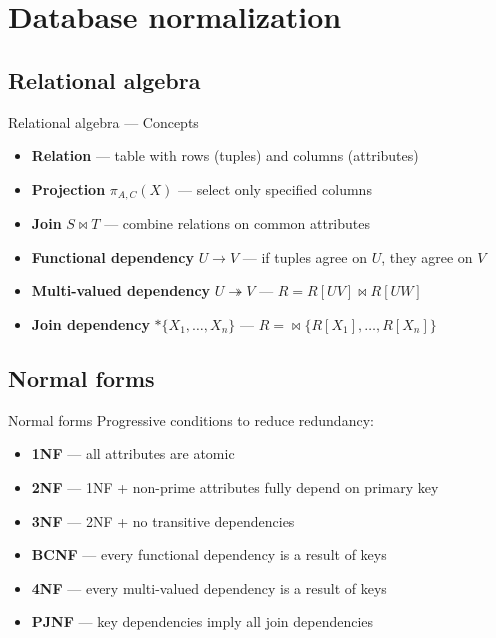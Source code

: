 \section{Database normalization}

\subsection{Relational algebra}

\begin{frame}{Relational algebra --- Concepts}
  \begin{itemize}
    \item \textbf{Relation} --- table with rows (tuples) and columns (attributes)
    \item \textbf{Projection} $\pi_{A,C}(X)$ --- select only specified columns
    \item \textbf{Join} $S \bowtie T$ --- combine relations on common attributes
    \item \textbf{Functional dependency} $U \to V$ --- if tuples agree on $U$,
      they agree on $V$
    \item \textbf{Multi-valued dependency} $U \twoheadrightarrow V$ ---
      $R = R[UV] \bowtie R[UW]$
    \item \textbf{Join dependency} $*\{X_1, \ldots, X_n\}$ ---
      $R = \bowtie\{R[X_1], \ldots, R[X_n]\}$
  \end{itemize}
\end{frame}

\subsection{Normal forms}

\begin{frame}{Normal forms}
  Progressive conditions to reduce redundancy:
  \begin{itemize}
    \item \textbf{1NF} --- all attributes are atomic
    \item \textbf{2NF} --- 1NF + non-prime attributes fully depend on primary key
    \item \textbf{3NF} --- 2NF + no transitive dependencies
    \item \textbf{BCNF} --- every functional dependency is a result of keys
    \item \textbf{4NF} --- every multi-valued dependency is a result of keys
    \item \textbf{PJNF} --- key dependencies imply all join dependencies
  \end{itemize}
\end{frame}

